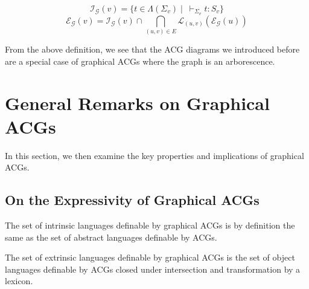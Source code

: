 $$
\mathcal{I}_{\mathcal{G}}(v) = \{t \in \Lambda(\Sigma_v)
\mid\ \vdash_{\Sigma_v} t : S_v\}
$$
$$
\mathcal{E}_{\mathcal{G}}(v) = \mathcal{I}_{\mathcal{G}}(v) \cap
\bigcap_{(u,v) \in E} \mathcal{L}_{(u,v)}(\mathcal{E}_{\mathcal{G}}(u))
$$

From the above definition, we see that the ACG diagrams we introduced
before are a special case of graphical ACGs where the graph is an
arborescence.

\section{General Remarks on Graphical ACGs}

In this section, we then examine the key properties and implications of
graphical ACGs.

\subsection{On the Expressivity of Graphical ACGs}

\begin{observation}
  The set of intrinsic languages definable by graphical ACGs is by
  definition the same as the set of abstract languages definable by
  ACGs.
\end{observation}

\begin{theorem}
  The set of extrinsic languages definable by graphical ACGs is the set
  of object languages definable by ACGs closed under intersection and
  transformation by a lexicon.
\end{theorem}

